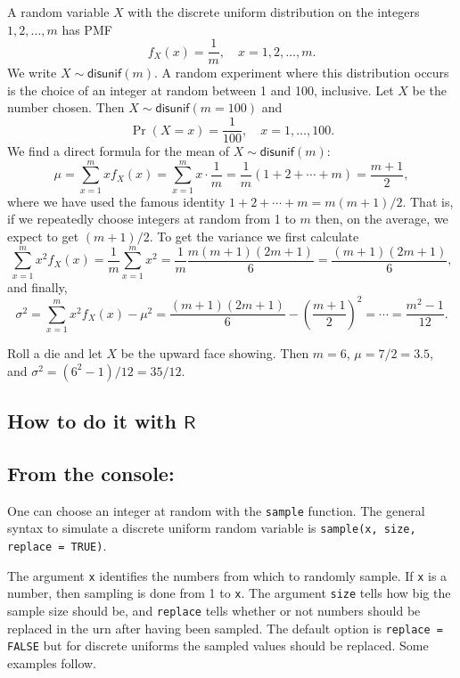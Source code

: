 \documentclass[captions=tableheading]{scrbook}
\begin{document}
A random variable \(X\) with the discrete uniform distribution on the integers \(1,2,\ldots,m\) has PMF
\begin{equation}
f_{X}(x)=\frac{1}{m},\quad x=1,2,\ldots,m.
\end{equation}
We write \(X\sim\mathsf{disunif}(m)\). A random experiment where this distribution occurs is the choice of an integer at random between 1 and 100, inclusive. Let \(X\) be the number chosen. Then \(X\sim\mathsf{disunif}(m=100)\) and
\[
\Pr(X=x)=\frac{1}{100},\quad x=1,\ldots,100.
\]
We find a direct formula for the mean of \(X\sim\mathsf{disunif}(m)\):
\begin{equation}
\mu=\sum_{x=1}^{m}xf_{X}(x)=\sum_{x=1}^{m}x\cdot\frac{1}{m}=\frac{1}{m}(1+2+\cdots+m)=\frac{m+1}{2},
\end{equation}
where we have used the famous identity \(1+2+\cdots+m=m(m+1)/2\). That is, if we repeatedly choose integers at random from 1 to \(m\) then, on the average, we expect to get \((m+1)/2\). To get the variance we first calculate
\[
\sum_{x=1}^{m}x^{2}f_{X}(x)=\frac{1}{m}\sum_{x=1}^{m}x^{2}=\frac{1}{m}\frac{m(m+1)(2m+1)}{6}=\frac{(m+1)(2m+1)}{6},
\]
and finally,
\begin{equation}
\sigma^{2}=\sum_{x=1}^{m}x^{2}f_{X}(x)-\mu^{2}=\frac{(m+1)(2m+1)}{6}-\left(\frac{m+1}{2}\right)^{2}=\cdots=\frac{m^{2}-1}{12}.
\end{equation}

\begin{example}
Roll a die and let \(X\) be the upward face showing. Then \(m=6\), \(\mu=7/2=3.5\), and \(\sigma^{2}=(6^{2}-1)/12=35/12\).
\end{example}
\subsection{How to do it with \(\mathsf{R}\)}
\label{sec-5-2-1}
\subsection{From the console:}
\label{sec-5-2-2}

One can choose an integer at random with the \texttt{sample} function. The general syntax to simulate a discrete uniform random variable is \texttt{sample(x, size, replace = TRUE)}.

The argument \texttt{x} identifies the numbers from which to randomly sample. If \texttt{x} is a number, then sampling is done from 1 to \texttt{x}. The argument \texttt{size} tells how big the sample size should be, and \texttt{replace} tells whether or not numbers should be replaced in the urn after having been sampled. The default option is \texttt{replace = FALSE} but for discrete uniforms the sampled values should be replaced. Some examples follow.
\end{document}
